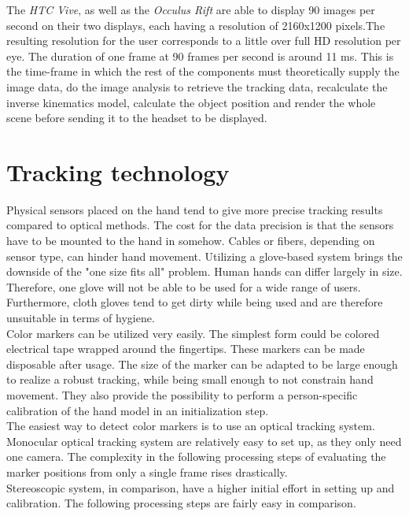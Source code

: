 The \textit{HTC Vive}, as well as the \textit{Occulus Rift} are able to display 90 images per second on their two displays, each having a resolution of 2160x1200 pixels.The resulting resolution for the user corresponds to a little over full HD resolution per eye. The duration of one frame at 90 frames per second is around 11 ms. This is the time-frame in which the rest of the components must theoretically supply the image data, do the image analysis to retrieve the tracking data, recalculate the inverse kinematics model, calculate the object position and render the whole scene before sending it to the headset to be displayed.
\section{Tracking technology}
Physical sensors placed on the hand tend to give more precise tracking results compared to optical methods. The cost for the data precision is that the sensors have to be mounted to the hand in somehow. Cables or fibers, depending on sensor type, can hinder hand movement. Utilizing a glove-based system brings the downside of the "one size fits all" problem. Human hands can differ largely in size. Therefore, one glove will not be able to be used for a wide range of users. Furthermore, cloth gloves tend to get dirty while being used and are therefore unsuitable in terms of hygiene.\\
Color markers can be utilized very easily. The simplest form could be colored electrical tape wrapped around the fingertips. These markers can be made disposable after usage. The size of the marker can be adapted to be large enough to realize a robust tracking, while being small enough to not constrain hand movement. They also provide the possibility to perform a person-specific calibration of the hand model in an initialization step.\\
The easiest way to detect color markers is to use an optical tracking system.
Monocular optical tracking system are relatively easy to set up, as they only need one camera. The complexity in the following processing steps of evaluating the marker positions from only a single frame rises drastically.\\
Stereoscopic system, in comparison, have a higher initial effort in setting up and calibration. The following processing steps are fairly easy in comparison. 
